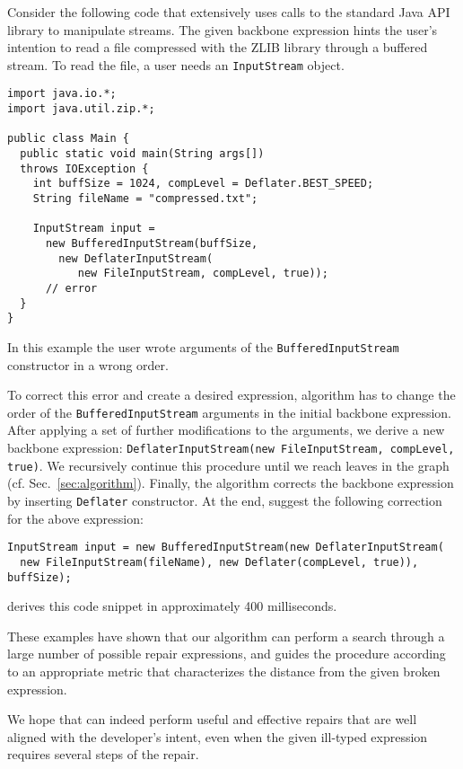 Consider the following code that extensively uses
calls to the standard Java API library to manipulate streams.
The given backbone expression hints the user's intention to read a file 
compressed with the ZLIB library through a buffered stream.
To read the file, a user needs an \lstinline{InputStream} object.
\begin{lstlisting}
import java.io.*;
import java.util.zip.*;

public class Main {
  public static void main(String args[]) 
  throws IOException {
    int buffSize = 1024, compLevel = Deflater.BEST_SPEED;
    String fileName = "compressed.txt";
    
    InputStream input = 
      new BufferedInputStream(buffSize,
        new DeflaterInputStream(
           new FileInputStream, compLevel, true)); 
      // error
  }
}
\end{lstlisting}

In this example the user wrote arguments of 
the \lstinline{BufferedInputStream} constructor in a wrong order.

To correct this error and create a desired expression, 
\ourTool algorithm has to change the order of
the \lstinline{BufferedInputStream} arguments in the initial backbone expression.
After applying a set of further modifications to the arguments, we derive 
a new backbone expression: 
\lstinline{DeflaterInputStream(new FileInputStream, compLevel, true)}.
We recursively continue this procedure until we reach leaves in the
\ourTool graph (cf. Sec.~\ref{sec:algorithm}). Finally, the algorithm corrects the backbone expression
by inserting \lstinline{Deflater} constructor. At the end, \ourTool suggest the following correction for the above expression:
\begin{lstlisting}    
InputStream input = new BufferedInputStream(new DeflaterInputStream(
  new FileInputStream(fileName), new Deflater(compLevel, true)), buffSize);
\end{lstlisting}
\ourTool derives this code snippet in approximately 400 milliseconds.

These examples have shown that our algorithm can perform a search through a large number of
possible repair expressions, and guides the procedure according to an appropriate metric
that characterizes the distance from the given broken expression.

We hope that \ourTool can indeed perform useful
and effective repairs that are well aligned with the developer's intent, even when
 the given ill-typed expression requires several steps of the repair.  





